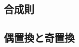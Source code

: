 \documentclass[12pt]{jsarticle}\usepackage{ifthen}\newboolean{enlarge}\setboolean{enlarge}{false}
\begin{document}
\subsection*{{{ 合成則}}}























%
\subsection{偶置換と奇置換}












%
\end{document}
